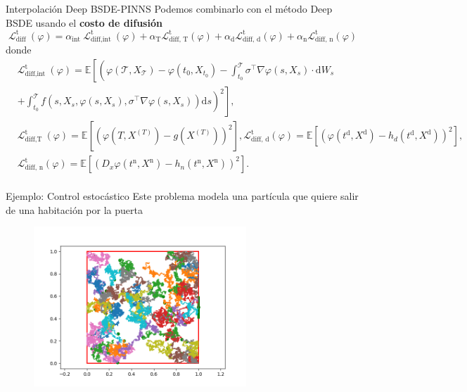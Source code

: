 \documentclass[aspectratio=169,xcolor=dvipsnames]{beamer}
\begin{document}
\begin{frame}{Interpolación Deep BSDE-PINNS}
	Podemos combinarlo con el método Deep BSDE usando el \textbf{costo de difusión} \parencite{nusken_interpolating_2023}
	\begin{equation}
		\mathcal{L}_{\text {diff }}^{\mathrm{t}}(\varphi)=\alpha_{\text {int }} \mathcal{L}_{\text {diff,int }}^{\mathrm{t}}(\varphi)+\alpha_{\mathrm{T}} \mathcal{L}_{\text {diff, } \mathrm{T}}^{\mathrm{t}}(\varphi)+\alpha_{\mathrm{d}} \mathcal{L}_{\text {diff, } \mathrm{d}}^{\mathrm{t}}(\varphi)+\alpha_{\mathrm{n}} \mathcal{L}_{\text {diff, } \mathrm{n}}^{\mathrm{t}}(\varphi)
	\end{equation}
donde
\begin{equation}
	\begin{aligned}
		& \mathcal{L}_{\text {diff,int }}^{\mathrm{t}}(\varphi)=\mathbb{E}\left[\left(\varphi\left(\mathcal{T},X_{\mathcal{T}} \right)-\varphi\left(t_0,X_{t_0}\right)-\int_{t_0}^{\mathcal{T}} \sigma^{\top} \nabla \varphi\left(s,X_s\right) \cdot \mathrm{d} W_s\right.\right. \\
		& \left.\left.+\int_{t_0}^{\mathcal{T}} f\left(s,X_s, \varphi\left(s,X_s\right), \sigma^{\top} \nabla \varphi\left(s,X_s\right)\right) \mathrm{d} s\right)^2\right] \text {, } \\
		 &\mathcal{L}_{\text {diff,T }}^{\mathrm{t}}(\varphi)=\mathbb{E}\left[\left(\varphi\left(T,X^{(T)}\right)-g\left(X^{(T)}\right)\right)^2\right] ,
		 \mathcal{L}_{\text {diff, } \mathrm{d}}^{\mathrm{t}}(\varphi)=\mathbb{E}\left[\left(\varphi\left(t^{\mathrm{d}},X^{\mathrm{d}}\right)-h_d\left(t^{\mathrm{d}},X^{\mathrm{d}}\right)\right)^2\right], \\
		&
		\mathcal{L}_{\text {diff, } \mathrm{n}}^{\mathrm{t}}(\varphi)=\mathbb{E}\left[\left(D_x\varphi\left(t^{\mathrm{n}},X^{\mathrm{n}} \right)-h_n\left(t^{\mathrm{n}},X^{\mathrm{n}}\right)\right)^2\right]. \\
	\end{aligned}
\end{equation}
\end{frame}

\begin{frame}{Ejemplo: Control estocástico}
	Este problema modela una partícula que quiere salir de una habitación por la puerta 
	\begin{figure}
		\centering
		\includegraphics[height=6cm]{images/pathsInterp}
		\label{fig:pathsinterp}
	\end{figure}
\end{frame}
\end{document}
